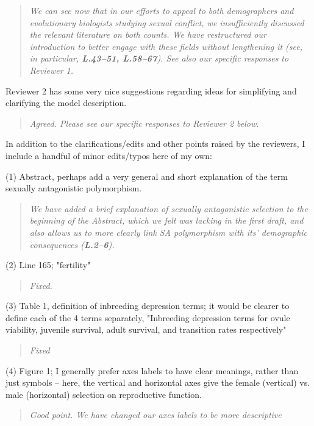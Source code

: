 \documentclass[11pt]{article}
\begin{document}
\begin{quote}
	{\itshape We can see now that in our efforts to appeal to both demographers and evolutionary biologists studying sexual conflict, we insufficiently discussed the relevant literature on both counts. We have restructured our introduction to better engage with these fields without lengthening it (see, in particular, {\bf L.43--51, L.58--67}). See also our specific responses to Reviewer 1. }
\end{quote}


Reviewer 2 has some very nice suggestions regarding ideas for simplifying and clarifying the model description.

\begin{quote}
	{\itshape Agreed. Please see our specific responses to Reviewer 2 below.}
\end{quote}

In addition to the clarifications/edits and other points raised by the reviewers, I include a handful of minor edits/typos here of my own:
\bigskip

\noindent (1) Abstract, perhaps add a very general and short explanation of the term sexually antagonistic polymorphism.
\begin{quote}
	{\itshape We have added a brief explanation of sexually antagonistic selection to the beginning of the Abstract, which we felt was lacking in the first draft, and also allows us to more clearly link SA polymorphism with its' demographic consequences ({\bf L.2--6}).}
\end{quote}

\noindent (2) Line 165; "fertility"
\begin{quote}
	{\itshape Fixed.}
\end{quote}

\noindent (3) Table 1, definition of inbreeding depression terms; it would be clearer to define each of the 4 terms separately, "Inbreeding depression terms for ovule viability, juvenile survival, adult survival, and transition rates respectively"
\begin{quote}
	{\itshape Fixed}
\end{quote}

\noindent (4) Figure 1; I generally prefer axes labels to have clear meanings, rather than just symbols – here, the vertical and horizontal axes give the female (vertical) vs. male (horizontal) selection on reproductive function.
\begin{quote}
	{\itshape Good point. We have changed our axes labels to be more descriptive }
\end{quote}
\end{document}
